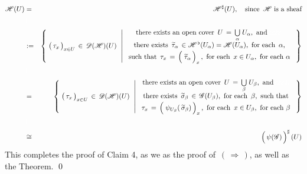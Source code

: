 \begin{eqnarray*}
\mathscr{H}(U)
& = &
	\mathscr{H}^{\sharp}(U),
	\quad
	\textnormal{since \,$\mathscr{H}$ is a sheaf}
\\ & {\color{white}\textnormal{\large$1$}} &
\\
& := &
	\left\{\;
		\left(\,\overset{{\color{white}.}}{\tau_{x}}\,\right)_{x \in U} \,\in\, \mathscr{D}(\mathscr{H})(U)
		\;\,\left\vert\;
			\begin{array}{c}
			\textnormal{there exists an open cover \,$U \,=\, \underset{\alpha}{\bigcup}\;U_{\alpha}$,\, and{\color{white}2222.}}
			\\
			\textnormal{there exists \,$\widetilde{\tau}_{\alpha} \,\in \mathscr{H}^{\,\flat}(U_{\alpha}) = \mathscr{H}(U_{\alpha})$,\, for each \,$\alpha$,}
			\\
			\textnormal{such that \,$\overset{{\color{white}\textnormal{\normalsize$1$}}}{\tau_{x}} \,=\, \left(\;\overset{{\color{white}.}}{\widetilde{\tau}_{\alpha}}\,\right)_{x}$\,,\, for each \,$x \in U_{\alpha}$,\, for each $\alpha$}
			\end{array}
			\right.
		\,\right\}
\\ & {\color{white}\textnormal{\large$1$}} &
\\
& = &
	\left\{\;
		\left(\,\overset{{\color{white}.}}{\tau_{x}}\,\right)_{x \in U} \,\in\, \mathscr{D}(\mathscr{H})(U)
		\;\,\left\vert\;
			\begin{array}{c}
			\textnormal{there exists an open cover \,$U \,=\, \underset{\beta}{\bigcup}\;U_{\beta}$,\, and{\color{white}2222.}}
			\\
			\textnormal{there exists \,$\widetilde{\sigma}_{\beta} \,\in\, \mathscr{G}(U_{\beta})$,\, for each \,$\beta$,\, such that}
			\\
			\textnormal{$\overset{{\color{white}\textnormal{\normalsize$1$}}}{\tau_{x}} \,=\, \left(\;\overset{{\color{white}.}}{\psi_{U_{\beta}}(\,\widetilde{\sigma}_{\beta})}\,\right)_{x}$\,,\, for each \,$x \in U_{\beta}$,\, for each $\beta$}
			\end{array}
			\right.
		\,\right\}
\\ & {\color{white}\textnormal{\large$1$}} &
\\
& \cong &
	\left(\,\overset{{\color{white}.}}{\psi(\mathscr{G})}\,\right)^{\sharp}(U)
\end{eqnarray*}
This completes the proof of Claim 4, as we as the proof of \,$(\,\Longrightarrow\,)$, as well as the Theorem.
\qed


